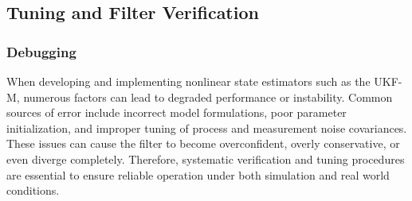 \subsection{Tuning and Filter Verification}
\subsubsection{Debugging}
When developing and implementing nonlinear state estimators such as the UKF-M, numerous factors can lead to degraded performance or instability. Common sources of error include incorrect model formulations, poor parameter initialization, and improper tuning of process and measurement noise covariances. These issues can cause the filter to become overconfident, overly conservative, or even diverge completely. Therefore, systematic verification and tuning procedures are essential to ensure reliable operation under both simulation and real world conditions.



